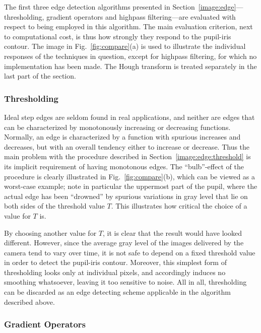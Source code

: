 The first three edge detection algorithms presented in
Section~\ref{image:edge}---thresholding, gradient operators and
highpass filtering---are evaluated with respect to being employed in
this algorithm.  The main evaluation criterion, next to computational
cost, is thus how strongly they respond to the pupil-iris contour. The
image in Fig.~\ref{fig:compare}(a) is used to illustrate the individual
responses of the techniques in question, except for highpass
filtering, for which no implementation has been made.  The Hough
transform is treated separately in the last part of the section.

\subsubsection{Thresholding}

Ideal step edges are seldom found in real applications, and neither
are edges that can be characterized by monotonously increasing or
decreasing functions.  Normally, an edge is characterized by a
function with spurious increases and decreases, but with an overall
tendency either to increase or decrease.  Thus the main problem with
the procedure described in Section~\ref{image:edge:threshold} is its
implicit requirement of having monotonous edges.  The ``bulb''-effect
of the procedure is clearly illustrated in Fig.~\ref{fig:compare}(b),
which can be viewed as a worst-case example; note in particular the
uppermost part of the pupil, where the actual edge has been
``drowned'' by spurious variations in gray level that lie on both
sides of the threshold value $T$.  This illustrates how critical the
choice of a value for $T$ is.

By choosing another value for $T$, it is clear that the result would
have looked different.  However, since the average gray level of the
images delivered by the camera tend to vary over time, it is not safe
to depend on a fixed threshold value in order to detect the pupil-iris
contour.  Moreover, this simplest form of thresholding looks only at
individual pixels, and accordingly induces no smoothing whatsoever,
leaving it too sensitive to noise.  All in all, thresholding can be
discarded as an edge detecting scheme applicable in the algorithm
described above.

\subsubsection{Gradient Operators}


